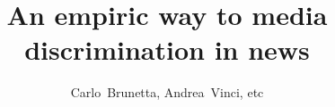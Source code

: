 \documentclass[10pt, journal,twocolumn]{IEEEtran}
\begin{document}
%
\title{An empiric way to media discrimination in news}
%
%
%

\author{Carlo~Brunetta,
        Andrea~Vinci, etc}%

% 
%



%

% 
\end{document}
